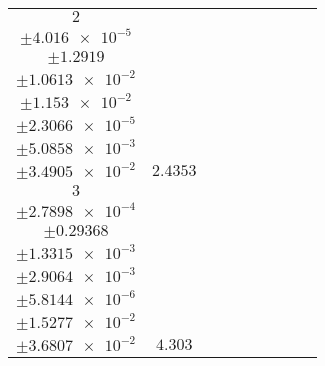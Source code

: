 \documentclass[8pt]{article}
\begin{document}
\begin{longtable}[l]{c c c c c c c c c}
$\num{2}$ & \begin{tabular}[c]{@{}c@{}}$\num{3.5377e-2}$ \\ $\pm\num{4.016e-5}$\end{tabular} & \begin{tabular}[c]{@{}c@{}}$\num{-2.6856}$ \\ $\pm\num{1.2919}$\end{tabular} & \begin{tabular}[c]{@{}c@{}}$\num{-5.6344}$ \\ $\pm\num{1.0613e-2}$\end{tabular} & \begin{tabular}[c]{@{}c@{}}$\num{2.9511e+3}$ \\ $\pm\num{1.153e-2}$\end{tabular} & \begin{tabular}[c]{@{}c@{}}$\num{5.9038}$ \\ $\pm\num{2.3066e-5}$\end{tabular} & \begin{tabular}[c]{@{}c@{}}$\num{2.693}$ \\ $\pm\num{5.0858e-3}$\end{tabular} & \begin{tabular}[c]{@{}c@{}}$\num{4.2373}$ \\ $\pm\num{3.4905e-2}$\end{tabular} & $\num{2.4353}$\\
$\num{3}$ & \begin{tabular}[c]{@{}c@{}}$\num{7.1318e-2}$ \\ $\pm\num{2.7898e-4}$\end{tabular} & \begin{tabular}[c]{@{}c@{}}$\num{5.3313}$ \\ $\pm\num{0.29368}$\end{tabular} & \begin{tabular}[c]{@{}c@{}}$\num{-0.97488}$ \\ $\pm\num{1.3315e-3}$\end{tabular} & \begin{tabular}[c]{@{}c@{}}$\num{2.9558e+3}$ \\ $\pm\num{2.9064e-3}$\end{tabular} & \begin{tabular}[c]{@{}c@{}}$\num{5.9132}$ \\ $\pm\num{5.8144e-6}$\end{tabular} & \begin{tabular}[c]{@{}c@{}}$\num{4.4311}$ \\ $\pm\num{1.5277e-2}$\end{tabular} & \begin{tabular}[c]{@{}c@{}}$\num{6.3278}$ \\ $\pm\num{3.6807e-2}$\end{tabular} & $\num{4.303}$\\

\end{longtable}
\end{document}
